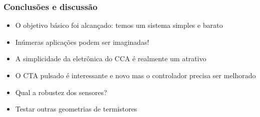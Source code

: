 \documentclass[12pt,handout]{beamer}
\begin{document}
\begin{frame}
  \frametitle{Conclusões e discussão}

  \begin{itemize}
  \item O objetivo básico foi alcançado: temos um sistema simples e barato
  \item Inúmeras aplicações podem ser imaginadas!
  \item A simplicidade da eletrônica do CCA é realmente um atrativo
  \item O CTA pulsado é interessante e novo mas o controlador precisa ser melhorado
  \item Qual a robustez dos sensores?
  \item Testar outras geometrias de termistores
  \end{itemize}
\end{frame}

    
  
    
      
  
\end{document}
